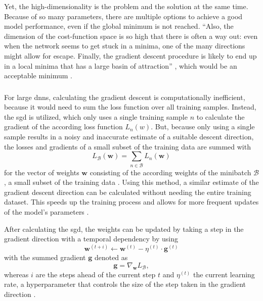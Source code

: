 Yet, the high-dimensionality is the problem and the solution at the same time. Because of so many parameters, there are multiple options to achieve a good model performance, even if the global minimum is not reached. \enquote{Also, the dimension of the cost-function space is so high that there is often a way out: even when the network seems to get stuck in a minima, one of the many directions might allow for escape. Finally, the gradient descent procedure is likely to end up in a local minima that has a large basin of attraction} \autocite[289]{Bernard2021}, which would be an acceptable minimum \autocite{Bernard2021,Goodfellow.Bengio.ea2016,Szeliski2022}.

\subsubsection*{}

For large \glspl{dnn}, calculating the gradient descent is computationally inefficient, because it would need to sum the loss function over all training samples. Instead, the \gls{sgd} is utilized, which only uses a single training sample \( n \) to calculate the gradient of the according loss function \( L_n(w) \). But, because only using a single sample results in a noisy and inaccurate estimate of a suitable descent direction, the losses and gradients of a small subset of the training data are summed with 
\begin{equation}
    L_\mathcal{B}(\mathbf{w}) = \sum_{n \in \mathcal{B}} L_n(\mathbf{w}) 
\end{equation}
for the vector of weights \( \mathbf{w} \) consisting of the according weights of the minibatch \( \mathcal{B} \), a small subset of the training data \autocite{Szeliski2022}. Using this method, a similar estimate of the gradient descent direction can be calculated without needing the entire training dataset. This speeds up the training process and allows for more frequent updates of the model's parameters \autocite{Bernard2021,Goyal.Dollar.ea2018,Netrapalli2019,Szeliski2022,Zhang.Lipton.ea2023}.

After calculating the \gls{sgd}, the weights can be updated by taking a step in the gradient direction with a temporal dependency by using
\begin{equation}
    \mathbf{w}^{(t+i)} \leftarrow \mathbf{w}^{(t)} - \eta^{(t)} \cdot \mathbf{g}^{(t)}
\label{eq:sgd}
\end{equation}
with the summed gradient \( \mathbf{g} \) denoted as
\begin{equation}
    \mathbf{g} = \nabla_\mathbf{w} L_\mathcal{B},
\end{equation}
whereas \( i \) are the steps ahead of the current step \( t \) and \( \eta^{(t)} \) the current learning rate, a hyperparameter that controls the size of the step taken in the gradient direction \autocite{Szeliski2022,Zhang.Lipton.ea2023}.

